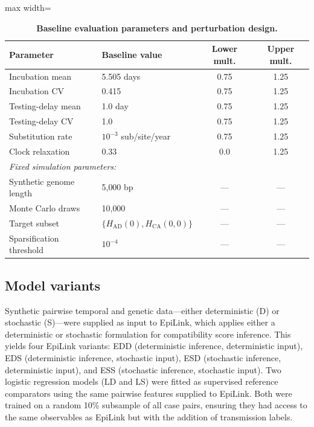 \documentclass[10pt,letterpaper]{article}
\begin{document}
\begin{table}[!ht]
	\caption{
		\textbf{Baseline evaluation parameters and perturbation design.}
	}\label{tab:parameters}
	\begin{adjustbox}{max width=\textwidth}
		\begin{tabular}{llcc}
			\toprule
			Parameter                & Baseline value                                 & Lower mult. & Upper mult. \\
			\midrule
			Incubation mean          & 5.505 days                                     & 0.75        & 1.25        \\
			Incubation CV            & 0.415                                          & 0.75        & 1.25        \\
			Testing-delay mean       & 1.0 day                                        & 0.75        & 1.25        \\
			Testing-delay CV         & 1.0                                            & 0.75        & 1.25        \\
			Substitution rate        & $10^{-3}$ sub/site/year                        & 0.75        & 1.25        \\
			Clock relaxation         & 0.33                                           & 0.0         & 1.25        \\
			\midrule
			\multicolumn{4}{l}{\textit{Fixed simulation parameters:}}                                             \\
			Synthetic genome length  & 5{,}000 bp                                     & ---         & ---         \\
			Monte Carlo draws        & 10{,}000                                       & ---         & ---         \\
			Target subset            & $\{H_{\mathrm{AD}}(0), H_{\mathrm{CA}}(0,0)\}$ & ---         & ---         \\
			Sparsification threshold & $10^{-4}$                                      & ---         & ---         \\
			\bottomrule
		\end{tabular}
	\end{adjustbox}
\end{table}

\subsection*{Model variants}

Synthetic pairwise temporal and genetic data---either deterministic (D) or stochastic (S)---were supplied as input to EpiLink, which applies either a deterministic or stochastic formulation for compatibility score inference. This yields four EpiLink variants: EDD (deterministic inference, deterministic input), EDS (deterministic inference, stochastic input), ESD (stochastic inference, deterministic input), and ESS (stochastic inference, stochastic input). Two logistic regression models (LD and LS) were fitted as supervised reference comparators using the same pairwise features supplied to EpiLink. Both were trained on a random 10\% subsample of all case pairs, ensuring they had access to the same observables as EpiLink but with the addition of transmission labels.
\end{document}

